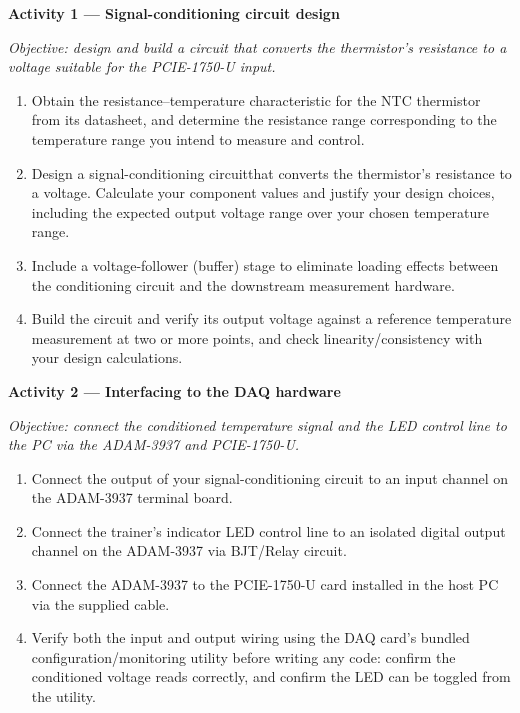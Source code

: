 \begin{procedure}

  \textbf{Activity 1 --- Signal-conditioning circuit design}\vspace{2pt}

  \textit{Objective: design and build a circuit that converts the thermistor's resistance to a voltage suitable for the PCIE-1750-U input.}

  \begin{enumerate}
    \item Obtain the resistance--temperature characteristic for the NTC thermistor from its datasheet, and determine the resistance range corresponding to the temperature range you intend to measure and control.
    \item Design a signal-conditioning circuitthat converts the thermistor's resistance to a voltage. Calculate your component values and justify your design choices, including the expected output voltage range over your chosen temperature range.
    \item Include a voltage-follower (buffer) stage to eliminate loading effects between the conditioning circuit and the downstream measurement hardware.
    \item Build the circuit and verify its output voltage against a reference temperature measurement at two or more points, and check linearity/consistency with your design calculations.
  \end{enumerate}
  \vspace*{1.5em}

  \textbf{Activity 2 --- Interfacing to the DAQ hardware}\vspace{2pt}

  \textit{Objective: connect the conditioned temperature signal and the LED control line to the PC via the ADAM-3937 and PCIE-1750-U.}

  \begin{enumerate}
    \item Connect the output of your signal-conditioning circuit to an input channel on the ADAM-3937 terminal board.
    \item Connect the trainer's indicator LED control line to an isolated digital output channel on the ADAM-3937 via BJT/Relay circuit.
    \item Connect the ADAM-3937 to the PCIE-1750-U card installed in the host PC via the supplied cable.
    \item Verify both the input and output wiring using the DAQ card's bundled configuration/monitoring utility before writing any code: confirm the conditioned voltage reads correctly, and confirm the LED can be toggled from the utility.
  \end{enumerate}
  \newpage


\end{procedure}
